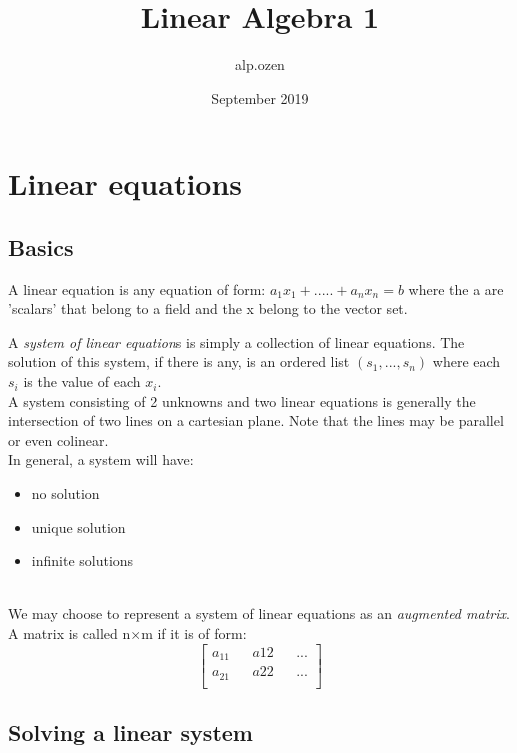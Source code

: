\documentclass{article}
\title{Linear Algebra 1}
\author{alp.ozen}
\date{September 2019}
\numberwithin{equation}{subsection}
\begin{document}
\maketitle

\section{Linear equations}
\subsection{Basics}

\begin{tcolorbox}
A linear equation is any equation of form:
$a_{1}x_{1}+ ..... + a_{n}x_{n} = b$
where the a are 'scalars' that belong to a field and the x belong to the vector set. 
\end{tcolorbox}

A \textit{system of linear equation}s is simply a collection of linear equations. The solution of this system, if there is any, is an ordered list $(s_{1},...,s_{n})$ where each $s_{i}$ is the value of each $x_{i}$.
\\

A system consisting of 2 unknowns and two linear equations is generally the intersection of two lines on a cartesian plane. Note that the lines may be parallel or even colinear. 
\\

In general, a system will have:
\begin{itemize}
    \item no solution
    \item unique solution
    \item infinite solutions 
\end{itemize}
\\

We may choose to represent a system of linear equations as an \textit{augmented matrix}. A matrix is called n$\times$m if it is of form:
\begin{equation*}
    \begin{bmatrix}
    a_{11} && a{12} &&  ... \\
    a_{21} && a {22}  && ... \\
    \end{bmatrix}
\end{equation*}

\subsection{Solving a linear system}
\end{document}

